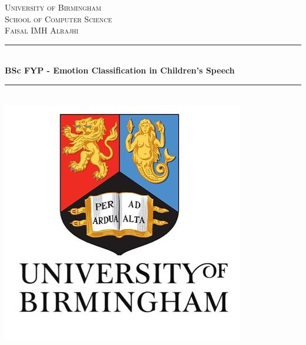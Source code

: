 \documentclass[12pt, a4paper, titlepage]{report}
\begin{document}
		\begin{titlepage}
		\newcommand{\HRule}{\rule{\linewidth}{0.5mm}} %
		
		\center %
		
		
		\textsc{\LARGE University of Birmingham}\\[1.5cm] %
		\textsc{\Large School of Computer Science}\\[0.5cm] %
		\textsc{\Large Faisal IMH Alrajhi}\\[0.5cm]
		

		\HRule \\[0.4cm]
		{ \huge \bfseries BSc FYP - Emotion Classification in Children's Speech}\\[0.4cm] %
		\HRule \\[1.5cm]

		
		\includegraphics[scale=0.75]{logo.png}\\[1cm] %
		
		
		\vfill %
		
	\end{titlepage}
\end{document}
